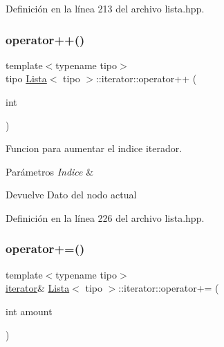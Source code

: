 Definición en la línea 213 del archivo lista.\+hpp.

\mbox{\label{classLista_1_1iterator_ac9059ed8e1f396ec967ae97b571d11fe}} 
\subsubsection{\texorpdfstring{operator++()}{operator++()}\hspace{0.1cm}{\footnotesize\ttfamily [2/2]}}
{\footnotesize\ttfamily template$<$typename tipo$>$ \\
tipo \hyperlink{classLista}{Lista}$<$ tipo $>$\+::iterator\+::operator++ (\begin{DoxyParamCaption}\item[{int}]{ }\end{DoxyParamCaption})\hspace{0.3cm}{\ttfamily [inline]}}



Funcion para aumentar el indice iterador. 


\begin{DoxyParams}{Parámetros}
{\em Indice} & \\
\hline
\end{DoxyParams}
\begin{DoxyReturn}{Devuelve}
Dato del nodo actual 
\end{DoxyReturn}


Definición en la línea 226 del archivo lista.\+hpp.

\mbox{\label{classLista_1_1iterator_a99315852e99d13cfac11f570917ac092}} 
\subsubsection{\texorpdfstring{operator+=()}{operator+=()}}
{\footnotesize\ttfamily template$<$typename tipo$>$ \\
\hyperlink{classLista_1_1iterator}{iterator}\& \hyperlink{classLista}{Lista}$<$ tipo $>$\+::iterator\+::operator+= (\begin{DoxyParamCaption}\item[{int}]{amount }\end{DoxyParamCaption})\hspace{0.3cm}{\ttfamily [inline]}}



